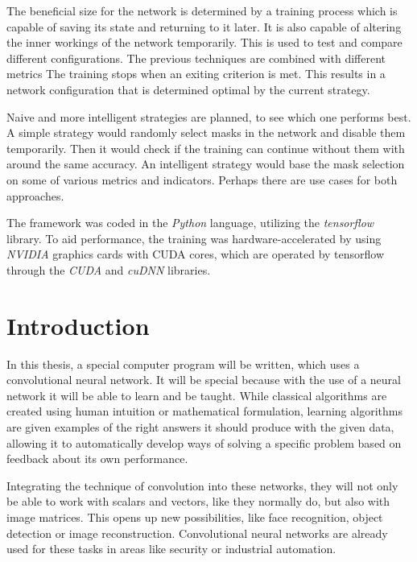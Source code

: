 \documentclass[12pt]{report}
\begin{document}
The beneficial size for the network is determined by a training process which is capable of saving its state and returning to it later. It is also capable of altering the inner workings of the network temporarily. This is used to test and compare different configurations. The previous techniques are combined with different metrics The training stops when an exiting criterion is met. This results in a network configuration that is determined optimal by the current strategy.\par

Naive and more intelligent strategies are planned, to see which one performs best. A simple strategy would randomly select masks in the network and disable them temporarily. Then it would check if the training can continue without them with around the same accuracy. An intelligent strategy would base the mask selection on some of various metrics and indicators. Perhaps there are use cases for both approaches.\par

The framework was coded in the \textit{Python} language, utilizing the \textit{tensorflow} library. To aid performance, the training was hardware-accelerated by using \textit{NVIDIA} graphics cards with CUDA cores, which are operated by tensorflow through the \textit{CUDA} and \textit{cuDNN} libraries.

\chapter*{Introduction}

In this thesis, a special computer program will be written, which uses a convolutional neural network. It will be special because with the use of a neural network it will be able to learn and be taught. While classical algorithms are created using human intuition or mathematical formulation, learning algorithms are given examples of the right answers it should produce with the given data, allowing it to automatically develop ways of solving a specific problem based on feedback about its own performance.\par

Integrating the technique of convolution into these networks, they will not only be able to work with scalars and vectors, like they normally do, but also with image matrices. This opens up new possibilities, like face recognition, object detection or image reconstruction. Convolutional neural networks are already used for these tasks in areas like security or industrial automation.\par
\end{document}
